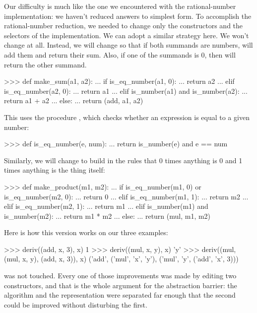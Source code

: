 Our difficulty is much like the one we encountered with the rational-number
implementation: we haven't reduced answers to simplest form.  To accomplish the
rational-number reduction, we needed to change only the constructors and the
selectors of the implementation.  We can adopt a similar strategy here.  We
won't change  at all.  Instead, we will change  so
that if both summands are numbers,  will add them and return
their sum.  Also, if one of the summands is 0, then  will return
the other summand.

\begin{codeBlock}
>>> def make_sum(a1, a2):
...     if is_eq_number(a1, 0):
...         return a2
...     elif is_eq_number(a2, 0):
...         return a1
...     elif is_number(a1) and is_number(a2):
...         return a1 + a2
...     else:
...         return (add, a1, a2)
\end{codeBlock}

\noindent
This uses the procedure , which checks whether an
expression is equal to a given number:

\begin{codeBlock}
>>> def is_eq_number(e, num):
...     return is_number(e) and e == num
\end{codeBlock}

\noindent
Similarly, we will change  to build in the rules that 0
times anything is 0 and 1 times anything is the thing itself:

\begin{codeBlock}
>>> def make_product(m1, m2):
...     if is_eq_number(m1, 0) or is_eq_number(m2, 0):
...         return 0
...     elif is_eq_number(m1, 1):
...         return m2
...     elif is_eq_number(m2, 1):
...         return m1
...     elif is_number(m1) and is_number(m2):
...         return m1 * m2
...     else:
...         return (mul, m1, m2)
\end{codeBlock}

\noindent
Here is how this version works on our three examples:

\begin{codeBlock}
>>> deriv((add, x, 3), x)
1
>>> deriv((mul, x, y), x)
'y'
>>> deriv((mul, (mul, x, y), (add, x, 3)), x)
('add', ('mul', 'x', 'y'), ('mul', 'y', ('add', 'x', 3)))
\end{codeBlock}

\noindent
{} was not touched.  Every one of those improvements was made by
editing two constructors, and that is the whole argument for the abstraction
barrier: the algorithm and the representation were separated far enough that
the second could be improved without disturbing the first.

